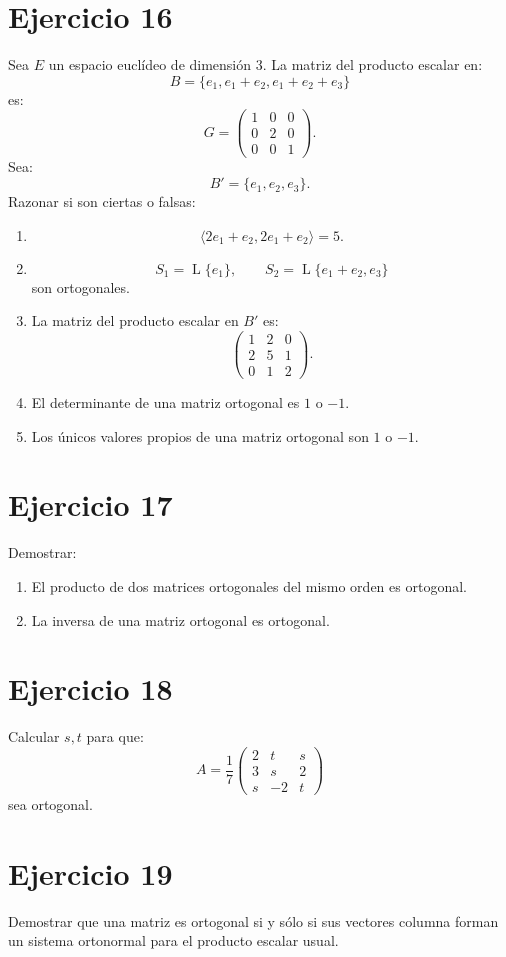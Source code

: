 \documentclass[11pt,a4paper]{article}
\newcommand{\Span}{\operatorname{L}}
\begin{document}
\section{Ejercicio 16}
Sea $E$ un espacio euclídeo de dimensión $3$. La matriz del producto escalar en:
\[
B=\{e_1,e_1+e_2,e_1+e_2+e_3\}
\]
es:
\[
G=
\begin{pmatrix}
1&0&0\\
0&2&0\\
0&0&1
\end{pmatrix}.
\]
Sea:
\[
B'=\{e_1,e_2,e_3\}.
\]
Razonar si son ciertas o falsas:
\begin{enumerate}[label=\arabic*)]
\item
\[
\langle2e_1+e_2,2e_1+e_2\rangle=5.
\]
\item
\[
S_1=\Span\{e_1\},
\qquad
S_2=\Span\{e_1+e_2,e_3\}
\]
son ortogonales.
\item La matriz del producto escalar en $B'$ es:
\[
\begin{pmatrix}
1&2&0\\
2&5&1\\
0&1&2
\end{pmatrix}.
\]
\item El determinante de una matriz ortogonal es $1$ o $-1$.
\item Los únicos valores propios de una matriz ortogonal son $1$ o $-1$.
\end{enumerate}

\section{Ejercicio 17}
Demostrar:
\begin{enumerate}[label=\alph*)]
\item El producto de dos matrices ortogonales del mismo orden es ortogonal.
\item La inversa de una matriz ortogonal es ortogonal.
\end{enumerate}

\section{Ejercicio 18}
Calcular $s,t$ para que:
\[
A=
\frac17
\begin{pmatrix}
2&t&s\\
3&s&2\\
s&-2&t
\end{pmatrix}
\]
sea ortogonal.

\section{Ejercicio 19}
Demostrar que una matriz es ortogonal si y sólo si sus vectores columna forman un sistema ortonormal para el producto escalar usual.
\end{document}
